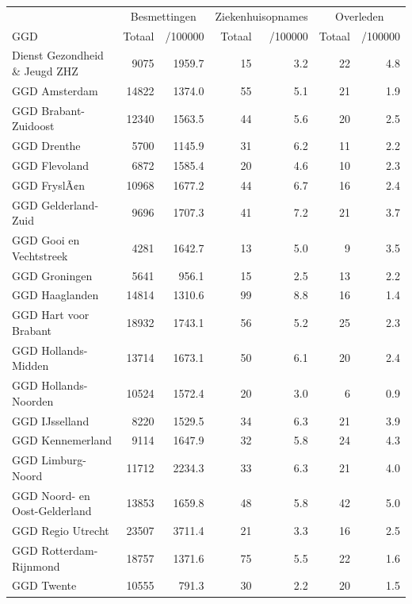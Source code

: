 \documentclass[
  english,
  man,floatsintext]{apa6}
\begin{document}
\begin{table}
\centering\begingroup\fontsize{10}{12}\selectfont

\begin{threeparttable}
\begin{tabular}{lrrrrrr}
\toprule
\multicolumn{1}{c}{ } & \multicolumn{2}{c}{Besmettingen} & \multicolumn{2}{c}{Ziekenhuisopnames} & \multicolumn{2}{c}{Overleden} \\
\cmidrule(l{3pt}r{3pt}){2-3} \cmidrule(l{3pt}r{3pt}){4-5} \cmidrule(l{3pt}r{3pt}){6-7}
GGD & Totaal & /100000 & Totaal & /100000 & Totaal & /100000\\
\midrule
Dienst Gezondheid \& Jeugd ZHZ & 9075 & 1959.7 & 15 & 3.2 & 22 & 4.8\\
GGD Amsterdam & 14822 & 1374.0 & 55 & 5.1 & 21 & 1.9\\
GGD Brabant-Zuidoost & 12340 & 1563.5 & 44 & 5.6 & 20 & 2.5\\
GGD Drenthe & 5700 & 1145.9 & 31 & 6.2 & 11 & 2.2\\
GGD Flevoland & 6872 & 1585.4 & 20 & 4.6 & 10 & 2.3\\
GGD FryslÃ¢n & 10968 & 1677.2 & 44 & 6.7 & 16 & 2.4\\
GGD Gelderland-Zuid & 9696 & 1707.3 & 41 & 7.2 & 21 & 3.7\\
GGD Gooi en Vechtstreek & 4281 & 1642.7 & 13 & 5.0 & 9 & 3.5\\
GGD Groningen & 5641 & 956.1 & 15 & 2.5 & 13 & 2.2\\
GGD Haaglanden & 14814 & 1310.6 & 99 & 8.8 & 16 & 1.4\\
GGD Hart voor Brabant & 18932 & 1743.1 & 56 & 5.2 & 25 & 2.3\\
GGD Hollands-Midden & 13714 & 1673.1 & 50 & 6.1 & 20 & 2.4\\
GGD Hollands-Noorden & 10524 & 1572.4 & 20 & 3.0 & 6 & 0.9\\
GGD IJsselland & 8220 & 1529.5 & 34 & 6.3 & 21 & 3.9\\
GGD Kennemerland & 9114 & 1647.9 & 32 & 5.8 & 24 & 4.3\\
GGD Limburg-Noord & 11712 & 2234.3 & 33 & 6.3 & 21 & 4.0\\
GGD Noord- en Oost-Gelderland & 13853 & 1659.8 & 48 & 5.8 & 42 & 5.0\\
GGD Regio Utrecht & 23507 & 3711.4 & 21 & 3.3 & 16 & 2.5\\
GGD Rotterdam-Rijnmond & 18757 & 1371.6 & 75 & 5.5 & 22 & 1.6\\
GGD Twente & 10555 & 791.3 & 30 & 2.2 & 20 & 1.5\\

\end{tabular}
\end{threeparttable}
\end{table}
\end{document}
